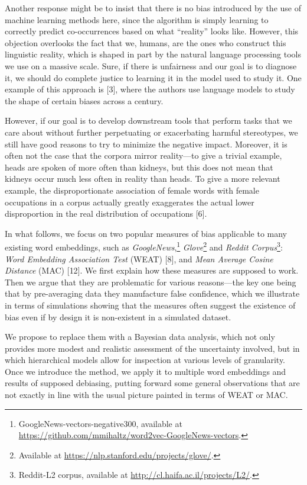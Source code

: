 \documentclass[
  12pt,
  dvipsnames,enabledeprecatedfontcommands]{scrartcl}
\begin{document}
Another response might be to insist that there is no bias introduced by
the use of machine learning methods here, since the algorithm is simply
learning to correctly predict co-occurrences based on what ``reality''
looks like. However, this objection overlooks the fact that we, humans,
are the ones who construct this linguistic reality, which is shaped in
part by the natural language processing tools we use on a massive scale.
Sure, if there is unfairness and our goal is to diagnose it, we should
do complete justice to learning it in the model used to study it. One
example of this approach is {[}3{]}, where the authors use language
models to study the shape of certain biases across a century.

However, if our goal is to develop downstream tools that perform tasks
that we care about without further perpetuating or exacerbating harmful
stereotypes, we still have good reasons to try to minimize the negative
impact. Moreover, it is often not the case that the corpora mirror
reality---to give a trivial example, heads are spoken of more often than
kidneys, but this does not mean that kidneys occur much less often in
reality than heads. To give a more relevant example, the
disproportionate association of female words with female occupations in
a corpus actually greatly exaggerates the actual lower disproportion in
the real distribution of occupations {[}6{]}.

In what follows, we focus on two popular measures of bias applicable to
many existing word embeddings, such as
\emph{GoogleNews},\footnote{GoogleNews-vectors-negative300, available at  \url{https://github.com/mmihaltz/word2vec-GoogleNews-vectors}.}
\emph{Glove}\footnote{Available at \url{https://nlp.stanford.edu/projects/glove/}.}
and
\emph{Reddit Corpus}\footnote{Reddit-L2 corpus, available at  \url{http://cl.haifa.ac.il/projects/L2/}.}:
\emph{Word Embedding Association Test} (\textsf{WEAT}) {[}8{]}, and
\emph{Mean Average Cosine Distance} (\textsf{MAC}) {[}12{]}. We first
explain how these measures are supposed to work. Then we argue that they
are problematic for various reasons---the key one being that by
pre-averaging data they manufacture false confidence, which we
illustrate in terms of simulations showing that the measures often
suggest the existence of bias even if by design it is non-existent in a
simulated dataset.

We propose to replace them with a Bayesian data analysis, which not only
provides more modest and realistic assessment of the uncertainty
involved, but in which hierarchical models allow for inspection at
various levels of granularity. Once we introduce the method, we apply it
to multiple word embeddings and results of supposed debiasing, putting
forward some general observations that are not exactly in line with the
usual picture painted in terms of \textsf{WEAT} or \textsf{MAC}.
\end{document}
